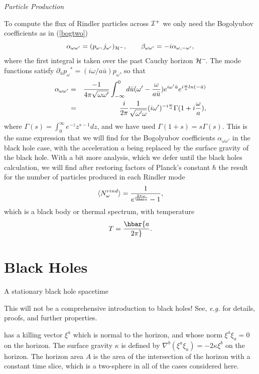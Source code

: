 \documentclass[12pt]{article}
\newcommand{\be}{\begin{equation}}
\newcommand{\ee}{\end{equation}}
\newcommand{\p}{\partial}
\def\bena{\begin{eqnarray}}
\def\eena{\end{eqnarray}}
\def\ph{{\cal H}^-}
\def\finf{{\cal I}^+}
\def\p{p_{\omega}}
\def\alp{\alpha _{\omega \omega '}}
\def\bet{\beta_{\omega\omega '}}
\def\ub{\bar u}
\begin{document}
\vskip 0.1in\goodbreak\noindent
{\it Particle Production}
\vskip 0.05in

To compute the flux
of Rindler particles across $\finf$ we only need the Bogolyubov coefficients
as in (\ref{bogtwo})
%
\be\label{rinbog} \alp = (\p ,j_{\omega '} )_{\ph}  ,\qquad
\bet=  -i\alpha_{\omega ,-\omega '},\ee
%
where the first integral is taken over the past Cauchy horizon $\ph\!$.
The mode functions satisfy  $\partial_{\ub}\p{}^* =(i\omega / a \ub)\p $,
so that
%
\bena\label{rinalp}\alp &=& {-1\over 4\pi \sqrt{\omega \omega '}}
\int_{-\infty}^0 d\ub (\omega ' -{\omega \over a\ub } ) e^{i\omega ' \ub}
e ^{i {\omega \over a} ln(-\ub )} \\
&=&{i\over 2\pi }{1\over \sqrt{\omega ' \omega }}
(i\omega ' )^{-i {\omega \over a}}\Gamma (1 +i {\omega \over a} ), \eena
%
where $\Gamma (s) =\int _0 ^{\infty} e ^{-z} z^{s-1} dz$, and
we have used $\Gamma (1+s) =s\Gamma (s)$.
This is the same expression that we will find for the Bogolyubov coefficients
$\alp$ in the black hole case, with the acceleration $a$ being replaced by
the surface
gravity of the black hole. With a bit more analysis, which we defer until
the black
holes calculation, we will find after restoring factors of Planck's
constant $\hbar$ the
result for the number of particles produced in each Rindler mode
%
\be\label{rinspec} \langle N_{\omega }^{rind} \rangle = {1\over e^{ {2\pi \omega \over
\hbar a} } -1 } ,\ee
%
which is a black body or thermal spectrum, with temperature
%
\be\label{rintemp}T=\hbar {a\over 2\pi}.\ee
%

\section{Black Holes}
\label{section4}

A stationary black hole spacetime\begin{footnote}
{This will not be a comprehensive introduction
to black holes! See, {\it e.g.} \cite{wald} for details, proofs, and
further properties.}
\end{footnote}
has a
killing vector $\xi^a$ which is normal to the horizon, and whose norm $\xi
^a \xi _a =0$ on the
horizon. The surface gravity $\kappa$ is defined by
$\nabla ^b (\xi ^a \xi _a )=-2\kappa \xi ^b$ on the horizon. The horizon area
$A$ is the area of the intersection of the horizon with a constant time
slice, which is a
two-sphere in all of the cases considered here.
\end{document}
